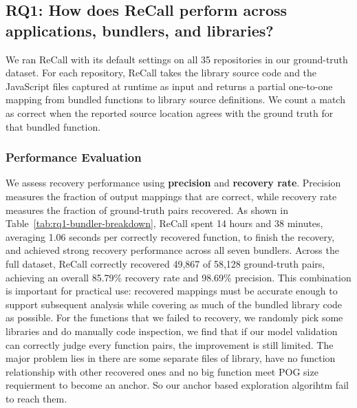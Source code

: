 \subsection{RQ1: How does ReCall perform across applications, bundlers, and libraries?}
\label{sec:rq1}


We ran ReCall with its default settings on all 35 repositories in our ground-truth dataset. For each repository, ReCall takes the library source code and the JavaScript files captured at runtime as input and returns a partial one-to-one mapping from bundled functions to library source definitions. We count a match as correct when the reported source location agrees with the ground truth for that bundled function.

\subsubsection{Performance Evaluation}

We assess recovery performance using \textbf{precision} and \textbf{recovery rate}. Precision measures the fraction of output mappings that are correct, while recovery rate measures the fraction of ground-truth pairs recovered. As shown in Table~\ref{tab:rq1-bundler-breakdown}, ReCall spent 14 hours and 38 minutes, averaging 1.06 seconds per correctly recovered function, to finish the recovery, and achieved strong recovery performance across all seven bundlers. Across the full dataset, ReCall correctly recovered 49,867 of 58,128 ground-truth pairs, achieving an overall 85.79\% recovery rate and 98.69\% precision. This combination is important for practical use: recovered mappings must be accurate enough to support subsequent analysis while covering as much of the bundled library code as possible. For the functions that we failed to recovery, we randomly pick some libraries and do manually code inspection, we find that if our model validation can correctly judge every function pairs, the improvement is still limited. The major problem lies in there are some separate files of library, have no function relationship with other recovered ones and no big function meet POG size requierment to become an anchor. So our anchor based exploration algorihtm fail to reach them.


